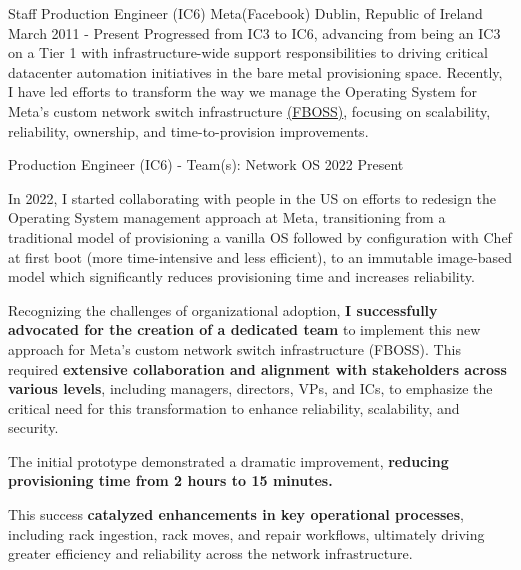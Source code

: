 
\begin{cventries}

  \cventry
  {Staff Production Engineer (IC6)} %
  {Meta(Facebook)} %
  {Dublin, Republic of Ireland} %
  {March 2011 - Present} %
  {
    Progressed from IC3 to IC6, advancing from being an IC3 on a Tier 1 with infrastructure-wide support responsibilities to
    driving critical datacenter automation initiatives in the bare metal provisioning space.
    Recently, I have led efforts to transform the way
    we manage the Operating System for Meta's custom network switch infrastructure
    \href{https://engineering.fb.com/2015/03/10/data-center-engineering/facebook-open-switching-system-fboss-and-wedge-in-the-open/}{(FBOSS)},
    focusing on scalability, reliability, ownership, and time-to-provision improvements.
  }
  \vspace{5mm}

  \cventryprevrole
  {Production Engineer (IC6) - Team(s): Network OS}
  {2022 \newline Present}
  {
    In 2022, I started collaborating with people in the US on efforts to redesign the Operating System management approach at Meta, transitioning from a traditional model of provisioning a vanilla OS followed by configuration with Chef at first boot (more time-intensive and less efficient), to an immutable image-based model which
    significantly reduces provisioning time and increases reliability.
    \vspace{2mm}
    \begin{cvitems}
      \item Recognizing the challenges of organizational adoption, \textbf{I successfully advocated for the creation of a dedicated team} to implement this new approach for Meta's custom network switch infrastructure (FBOSS). This required \textbf{extensive collaboration and alignment with stakeholders across various levels}, including managers, directors, VPs, and ICs, to emphasize the critical need for this transformation to enhance reliability, scalability, and security.
      \item The initial prototype demonstrated a dramatic improvement, \textbf{reducing provisioning time from 2 hours to 15 minutes.}
      \item This success \textbf{catalyzed enhancements in key operational processes}, including rack ingestion, rack moves, and repair workflows, ultimately driving greater efficiency and reliability across the network infrastructure.
    \end{cvitems}
  }


\end{cventries}
